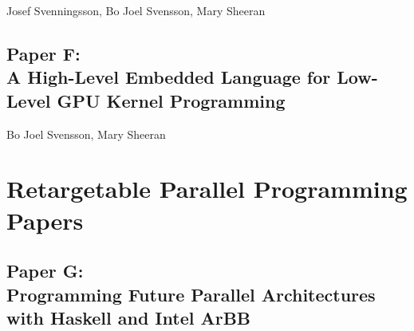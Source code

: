 \documentclass[a4paper]{book}
\newcommand{\paperETitle}{Counting and Occurrence Sort for GPUs using an Embedded Language}
\newcommand{\paperF}{Paper F}
\newcommand{\paperFTitle}{A High-Level Embedded Language for Low-Level GPU Kernel Programming}
\newcommand{\paperG}{Paper G}
\newcommand{\paperGTitle}{Programming Future Parallel Architectures with Haskell and Intel ArBB}
\begin{document}

\begin{center} 
Josef Svenningsson, Bo Joel Svensson, Mary Sheeran 
\end{center}





% 
\cleardoublepage 


\section[\paperFTitle]{\paperF: \\ \paperFTitle}
\label{sec:paperF}




\begin{center} 
Bo Joel Svensson, Mary Sheeran
\end{center}








% 

\chapter{Retargetable Parallel Programming Papers}
\label{chap:ArBB}
% 
\cleardoublepage 


\section[\paperGTitle]{\paperG: \\ \paperGTitle}
\label{sec:paperG}
\end{document}

